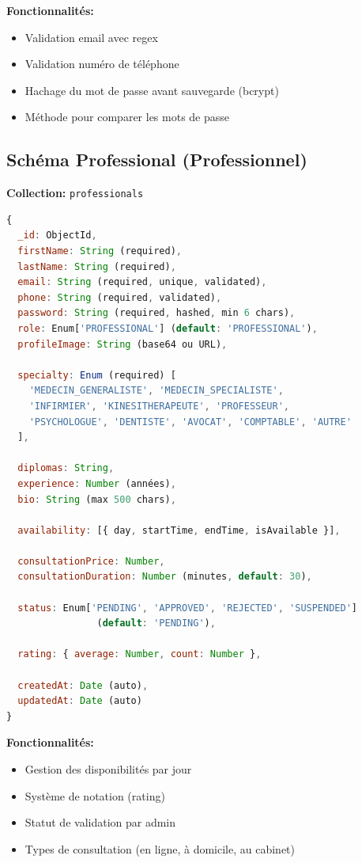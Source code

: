 \documentclass[12pt,a4paper]{article}
\begin{document}
\textbf{Fonctionnalités:}
\begin{itemize}
    \item Validation email avec regex
    \item Validation numéro de téléphone
    \item Hachage du mot de passe avant sauvegarde (bcrypt)
    \item Méthode pour comparer les mots de passe
\end{itemize}

\subsection{Schéma Professional (Professionnel)}

\textbf{Collection:} \texttt{professionals}

\begin{lstlisting}[language=JavaScript,caption=Modèle Professional (extrait)]
{
  _id: ObjectId,
  firstName: String (required),
  lastName: String (required),
  email: String (required, unique, validated),
  phone: String (required, validated),
  password: String (required, hashed, min 6 chars),
  role: Enum['PROFESSIONAL'] (default: 'PROFESSIONAL'),
  profileImage: String (base64 ou URL),
  
  specialty: Enum (required) [
    'MEDECIN_GENERALISTE', 'MEDECIN_SPECIALISTE',
    'INFIRMIER', 'KINESITHERAPEUTE', 'PROFESSEUR',
    'PSYCHOLOGUE', 'DENTISTE', 'AVOCAT', 'COMPTABLE', 'AUTRE'
  ],
  
  diplomas: String,
  experience: Number (années),
  bio: String (max 500 chars),
  
  availability: [{ day, startTime, endTime, isAvailable }],
  
  consultationPrice: Number,
  consultationDuration: Number (minutes, default: 30),
  
  status: Enum['PENDING', 'APPROVED', 'REJECTED', 'SUSPENDED']
                (default: 'PENDING'),
  
  rating: { average: Number, count: Number },
  
  createdAt: Date (auto),
  updatedAt: Date (auto)
}
\end{lstlisting}

\textbf{Fonctionnalités:}
\begin{itemize}
    \item Gestion des disponibilités par jour
    \item Système de notation (rating)
    \item Statut de validation par admin
    \item Types de consultation (en ligne, à domicile, au cabinet)
\end{itemize}
\end{document}
